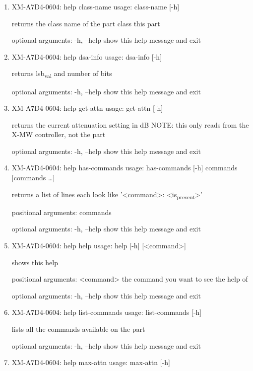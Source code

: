\documentclass[11pt]{article}
\begin{document}
\begin{enumerate}
\item XM-A7D4-0604: help class-name
\label{sec:org7c419e1}
usage: class-name [-h]

returns the class name of the part class this part

optional arguments:
  -h, --help  show this help message and exit

\item XM-A7D4-0604: help dsa-info
\label{sec:orga4b3793}
usage: dsa-info [-h]

returns lsb\textsubscript{val} and number of bits

optional arguments:
  -h, --help  show this help message and exit

\item XM-A7D4-0604: help get-attn
\label{sec:org51230a7}
usage: get-attn [-h]

returns the current attenuation setting in dB NOTE: this only reads from the
X-MW controller, not the part

optional arguments:
  -h, --help  show this help message and exit

\item XM-A7D4-0604: help has-commands
\label{sec:org2c487eb}
usage: has-commands [-h] commands [commands \ldots{}]

returns a list of lines each look like '<command>: <is\textsubscript{present}>'

positional arguments:
  commands

optional arguments:
  -h, --help  show this help message and exit

\item XM-A7D4-0604: help help
\label{sec:org9e0659b}
usage: help [-h] [<command>]

shows this help

positional arguments:
  <command>   the command you want to see the help of

optional arguments:
  -h, --help  show this help message and exit

\item XM-A7D4-0604: help list-commands
\label{sec:orgfe31d90}
usage: list-commands [-h]

lists all the commands available on the part

optional arguments:
  -h, --help  show this help message and exit

\item XM-A7D4-0604: help max-attn
\label{sec:org81d2aba}
usage: max-attn [-h]


\end{enumerate}
\end{document}
